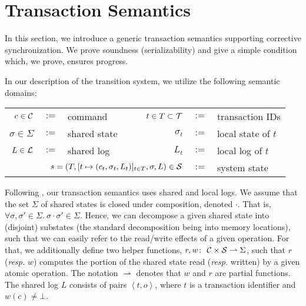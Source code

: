 \section{Transaction Semantics}
\label{sec:concretesemantics}

In this section, we introduce a generic transaction semantics supporting corrective synchronization. We prove soundness (serializability) and give a simple condition which, we prove, ensures progress.


%
In our description of the transition system, we utilize the following semantic domains:
\begin{center}
\footnotesize
\begin{tabular}{rclrrl}
	$c \in {\cal C}$ & $:=$ & command & $t \in T \subset {\cal T}$ & $:=$ & transaction IDs \\
	$\sigma \in \Sigma$ & $:=$ & shared state $\;\;\;\;\;\;$ & ${\sigma_t}$ & $:=$ & local state of $t$ \\
	$L \in {\cal L}$ & $:=$ & shared log &
	$L_t$ & $:=$ & local log of $t$ \\
	\multicolumn{4}{r}{
		$s = (T, [t \mapsto (c_t,\sigma_t,L_t)]_{t \in T}, \sigma, L) \in {\cal S}$} & $:=$ & system state \\
\end{tabular}
\end{center}
\normalsize
Following \cite{KoskinenP15}, our transaction semantics uses shared and local logs.
We assume that the set $\Sigma$ of shared states is closed under composition, denoted $\cdot$. That is,
$\forall \sigma,\sigma' \in \Sigma.\ \sigma \cdot \sigma' \in \Sigma$. Hence, we can decompose a given shared state into (disjoint) substates (the standard decomposition being into memory locations), such that we can easily refer to the read/write effects of a given operation.
For that, we additionally define two helper functions,
$r,w \colon\ {\cal C} \times {\cal S} \rightharpoonup \Sigma$, such that $r$ (\textit{resp.} $w$) computes the portion of the shared state read (\textit{resp.} written) by a given atomic operation.
The notation $\rightharpoonup$ denotes that $w$ and $r$ are partial functions. The shared log $L$ consists of pairs $\left\langle t,o \right\rangle$, where $t$ is a transaction identifier and $w(c) \neq \bot$.


